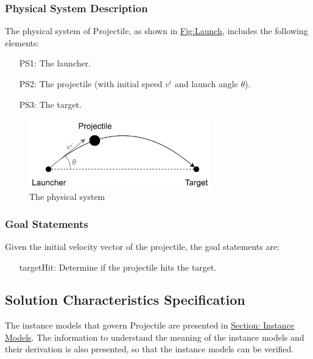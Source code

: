 \documentclass[12pt]{article}
\begin{document}
\subsubsection{Physical System Description}
\label{Sec:PhysSyst}
The physical system of Projectile, as shown in \hyperref[Figure:Launch]{Fig:Launch}, includes the following elements:
\begin{itemize}
\item[PS1:]The launcher.
\item[PS2:]The projectile (with initial speed ${v^{i}}$ and launch angle $θ$).
\item[PS3:]The target.
\end{itemize}
\begin{figure}
\begin{center}
\includegraphics[width=0.7\textwidth]{../../../datafiles/Projectile/Launch.jpg}
\caption{The physical system}
\label{Figure:Launch}
\end{center}
\end{figure}
\subsubsection{Goal Statements}
\label{Sec:GoalStmt}
Given the initial velocity vector of the projectile, the goal statements are:
\begin{itemize}
\item[targetHit:\phantomsection\label{targetHit}]Determine if the projectile hits the target.
\end{itemize}
\subsection{Solution Characteristics Specification}
\label{Sec:SolCharSpec}
The instance models that govern Projectile are presented in \hyperref[Sec:IMs]{Section: Instance Models}. The information to understand the meaning of the instance models and their derivation is also presented, so that the instance models can be verified.
\end{document}
